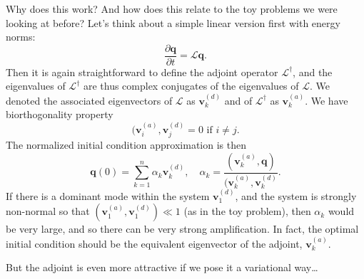 \documentclass[a4paper]{article}
\begin{document}
Why does this work? And how does this relate to the toy problems we were looking at before? Let's think about a simple linear version first with energy norms:
\[
  \frac{\partial \mathbf{q}}{\partial t} = \mathcal{L} \mathbf{q}.
\]
Then it is again straightforward to define the adjoint operator $\mathcal{L}^\dagger$, and the eigenvalues of $\mathcal{L}^\dagger$ are thus complex conjugates of the eigenvalues of $\mathcal{L}$. We denoted the associated eigenvectors of $\mathcal{L}$ as $\mathbf{v}_k^{(d)}$ and of $\mathcal{L}^\dagger$ as $\mathbf{v}_k^{(a)}$. We have biorthogonality property
\[
  (\mathbf{v}_i^{(a)}, \mathbf{v}_j^{(d)} = 0 \text{ if }i \not= j.
\]
The normalized initial condition approximation is then
\[
  \mathbf{q}(0) = \sum_{k = 1}^n \alpha_k \mathbf{v}_k^{(d)},\quad \alpha_k = \frac{(\mathbf{v}_k^{(a)}, \mathbf{q})}{(\mathbf{v}_k^{(a)}, \mathbf{v}_k^{(d)}}.
\]
If there is a dominant mode within the system $\mathbf{v}_1^{(d)}$, and the system is strongly non-normal so that $(\mathbf{v}_1^{(a)}, \mathbf{v}_1^{(d)}) \ll 1$ (as in the toy problem), then $\alpha_k$ would be very large, and so there can be very strong amplification. In fact, the optimal initial condition should be the equivalent eigenvector of the adjoint, $\mathbf{v}_k^{(a)}$.

But the adjoint is even more attractive if we pose it a variational way\ldots
\end{document}
